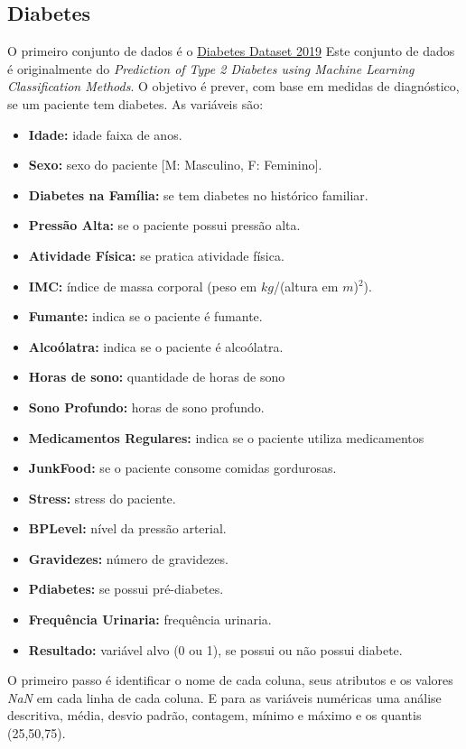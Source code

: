 \subsection{Diabetes}
O primeiro conjunto de dados é o \href{https://www.kaggle.com/datasets/tigganeha4/diabetes-dataset-2019}{Diabetes Dataset 2019}
Este conjunto de dados é originalmente do \textit{Prediction of Type 2 Diabetes using Machine Learning Classification Methods}. O objetivo é prever, com base em medidas de diagnóstico, se um paciente tem diabetes. As variáveis são:
\begin{itemize}
    \item \textbf{Idade:} idade faixa de anos.
    \item \textbf{Sexo:} sexo do paciente [M: Masculino, F: Feminino].
    \item \textbf{Diabetes na Família:} se tem diabetes no histórico familiar.
    \item \textbf{Pressão Alta:} se o paciente possui pressão alta.
    \item \textbf{Atividade Física:} se pratica atividade física.
    \item \textbf{IMC:} índice de massa corporal (peso em $kg$/(altura em $m$)$^2$).
    \item \textbf{Fumante:} indica se o paciente é fumante.
    \item \textbf{Alcoólatra:} indica se o paciente é alcoólatra.
    \item \textbf{Horas de sono:} quantidade de horas de sono
    \item \textbf{Sono Profundo:} horas de sono profundo.
    \item \textbf{Medicamentos Regulares:} indica se o paciente utiliza medicamentos
    \item \textbf{JunkFood:} se o paciente consome comidas gordurosas.
    \item \textbf{Stress:} stress do paciente.
    \item \textbf{BPLevel:} nível da pressão arterial.
    \item \textbf{Gravidezes:} número de gravidezes.
    \item \textbf{Pdiabetes:} se possui pré-diabetes.
    \item \textbf{Frequência Urinaria:} frequência urinaria.
    \item \textbf{Resultado:} variável alvo (0 ou 1), se possui ou não possui diabete.
    
\end{itemize}
O primeiro passo é identificar o nome de cada coluna, seus atributos e os valores \textit{NaN} em cada linha de cada coluna. E para as variáveis numéricas uma análise descritiva, média, desvio padrão, contagem, mínimo e máximo e os quantis (25,50,75).
 
